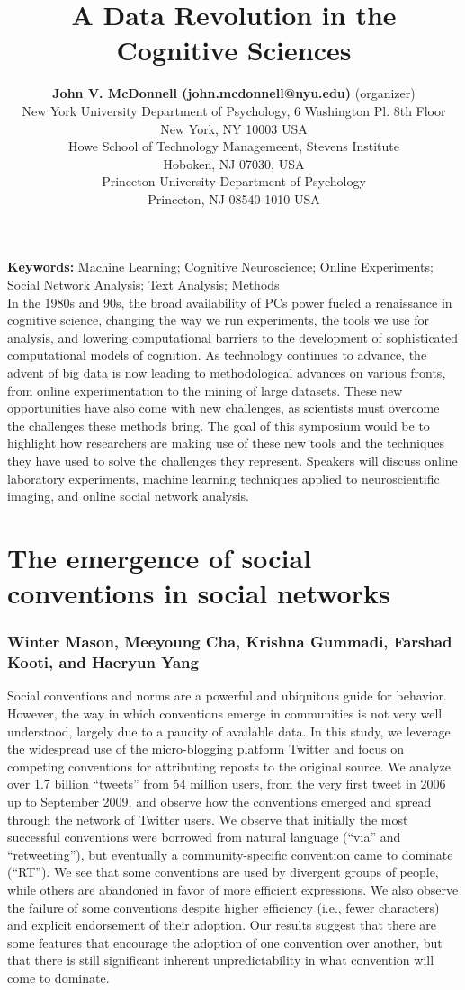 \documentclass[10pt,letterpaper]{article}
\title{A Data Revolution in the Cognitive Sciences}
\author{{\large \bf John V. McDonnell (john.mcdonnell@nyu.edu)} (organizer) \\
  New York University Department of Psychology, 6 Washington Pl. 8th Floor \\
  New York, NY 10003 USA
  \AND {\large \bf Winter Mason (m@winteram.com)} \\
  Howe School of Technology Managemeent, Stevens Institute \\
  Hoboken, NJ 07030, USA
  \AND {\large \bf John Myles White (jmw@johnmyleswhite.com)} \\
  Princeton University Department of Psychology \\
  Princeton, NJ 08540-1010 USA}
\begin{document}
\maketitle


\textbf{Keywords:} 
Machine Learning; Cognitive Neuroscience; Online Experiments; Social Network
Analysis; Text Analysis; Methods\\

In the 1980s and 90s, the broad availability of PCs power fueled a renaissance in
cognitive science, changing the way we run experiments, the tools we use for
analysis, and lowering computational barriers to the development of sophisticated
computational models of cognition. As technology continues to advance, the advent
of big data is now leading to methodological advances on various fronts, from
online experimentation to the mining of large datasets. These new opportunities
have also come with new challenges, as scientists must overcome the challenges
these methods bring. The goal of this symposium would be to highlight how
researchers are making use of these new tools and the techniques they have used
to solve the challenges they represent. Speakers will discuss online laboratory
experiments, machine learning techniques applied to neuroscientific imaging, and
online social network analysis.

\section{The emergence of social conventions in social networks}
\subsubsection{Winter Mason, Meeyoung Cha, Krishna Gummadi, Farshad Kooti, and
Haeryun Yang}

Social conventions and norms are a powerful and ubiquitous guide for behavior.
However, the way in which conventions emerge in communities is not very well
understood, largely due to a paucity of available data.  In this study, we
leverage the widespread use of the micro-blogging platform Twitter and focus on
competing conventions for attributing reposts to the original source.  We analyze
over 1.7 billion ``tweets'' from 54 million users, from the very first tweet in
2006 up to September 2009, and observe how the conventions emerged and spread
through the network of Twitter users.  We observe that initially the most
successful conventions were borrowed from natural language (``via'' and
``retweeting''), but eventually a community-specific convention came to dominate
(``RT'').  We see that some conventions are used by divergent groups of people,
while others are abandoned in favor of more efficient expressions.  We also
observe the failure of some conventions despite higher efficiency (i.e., fewer
characters) and explicit endorsement of their adoption.  Our results suggest that
there are some features that encourage the adoption of one convention over
another, but that there is still significant inherent unpredictability in what
convention will come to dominate.
\end{document}
